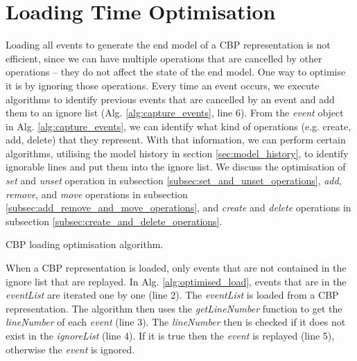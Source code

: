 \documentclass[sigconf]{acmart}
\begin{document}
\section{Loading Time Optimisation}
\label{sec:loading_time_optimisation}
Loading all events to generate the end model of a CBP representation is not efficient, since we can have multiple operations that are cancelled by other operations -- they do not affect the state of the end model. One way to optimise it is by ignoring those operations. Every time an event occurs, we execute algorithms to identify previous events that are cancelled by an event and add them to an ignore list (Alg. \ref{alg:capture_events}, line 6). From the \emph{event} object in Alg. \ref{alg:capture_events}, we can identify what kind of  operations (e.g. create, add, delete) that they represent. With that information, we can perform certain algorithms, utilising the model history in section \ref{sec:model_history}, to identify ignorable lines and put them into the ignore list. We discuss the optimisation of \emph{set} and \emph{unset} operation in subsection \ref{subsec:set_and_unset_operations}, \emph{add}, \emph{remove}, and \emph{move} operations in subsection \ref{subsec:add_remove_and_move_operations}, and \emph{create} and \emph{delete} operations in subsection \ref{subsec:create_and_delete_operations}.

\begin{algorithm}
\caption{CBP loading optimisation algorithm.}
\label{alg:optimised_load}
\end{algorithm}

When a CBP representation is loaded, only events that are not contained in the ignore list that are replayed. In Alg. \ref{alg:optimised_load}, events that are in the \emph{eventList} are iterated one by one (line 2). The \emph{eventList} is loaded from a CBP representation. The algorithm then uses the \emph{getLineNumber} function to get the \emph{lineNumber} of each \emph{event} (line 3). The \emph{lineNumber} then is checked if it does not exist in the \emph{ignoreList} (line 4). If it is true then the \emph{event} is replayed (line 5), otherwise the \emph{event} is ignored.   
\end{document}
